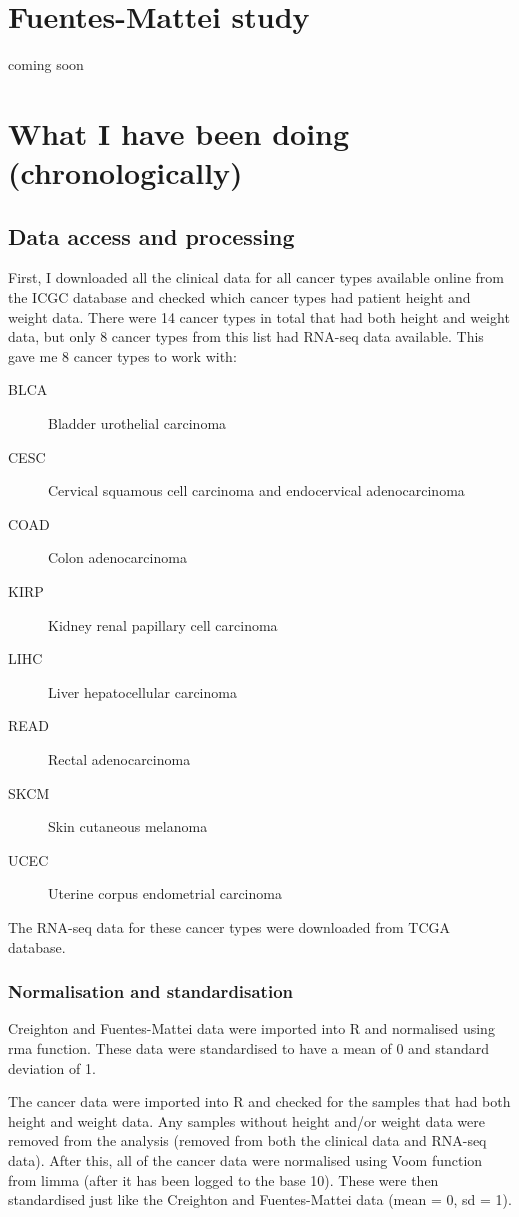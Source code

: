 \documentclass[a4paper, 11pt]{article}
\begin{document}
\section*{Fuentes-Mattei study}

coming soon


\section*{What I have been doing (chronologically)}

\subsection*{Data access and processing}

First, I downloaded all the clinical data for all cancer types available online from the ICGC database and checked which cancer types had patient height and weight data.
There were 14 cancer types in total that had both height and weight data, but only 8 cancer types from this list had RNA-seq data available.
This gave me 8 cancer types to work with:
\begin{description}
	\item[BLCA] Bladder urothelial carcinoma
	\item[CESC] Cervical squamous cell carcinoma and endocervical adenocarcinoma
	\item[COAD] Colon adenocarcinoma
	\item[KIRP] Kidney renal papillary cell carcinoma
	\item[LIHC] Liver hepatocellular carcinoma
	\item[READ] Rectal adenocarcinoma
	\item[SKCM] Skin cutaneous melanoma
	\item[UCEC] Uterine corpus endometrial carcinoma
\end{description}

The RNA-seq data for these cancer types were downloaded from TCGA database.

\subsubsection*{Normalisation and standardisation}

Creighton and Fuentes-Mattei data were imported into R and normalised using rma function.
These data were standardised to have a mean of 0 and standard deviation of 1.

The cancer data were imported into R and checked for the samples that had both height and weight data.
Any samples without height and/or weight data were removed from the analysis (removed from both the clinical data and RNA-seq data).
After this, all of the cancer data were normalised using Voom function  from limma (after it has been logged to the base 10).
These were then standardised just like the Creighton and Fuentes-Mattei data (mean = 0, sd = 1).
\end{document}
